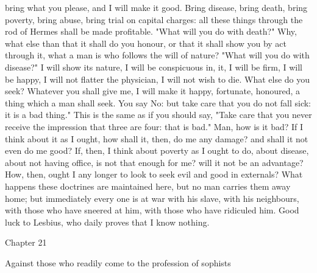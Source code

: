 \documentclass[a4paper]{article}
\begin{document}
bring what you please, and I will make it good. Bring disease, bring death,
bring poverty, bring abuse, bring trial on capital charges: all these things
through the rod of Hermes shall be made profitable. "What will you do with
death?" Why, what else than that it shall do you honour, or that it shall show
you by act through it, what a man is who follows the will of nature? "What will
you do with disease?" I will show its nature, I will be conspicuous in, it, I
will be firm, I will be happy, I will not flatter the physician, I will not
wish to die. What else do you seek? Whatever you shall give me, I will make it
happy, fortunate, honoured, a thing which a man shall seek.
    You say No: but take care that you do not fall sick: it is a bad thing."
This is the same as if you should say, "Take care that you never receive the
impression that three are four: that is bad." Man, how is it bad? If I think
about it as I ought, how shall it, then, do me any damage? and shall it not
even do me good? If, then, I think about poverty as I ought to do, about
disease, about not having office, is not that enough for me? will it not be an
advantage? How, then, ought I any longer to look to seek evil and good in
externals? What happens these doctrines are maintained here, but no man carries
them away home; but immediately every one is at war with his slave, with his
neighbours, with those who have sneered at him, with those who have ridiculed
him. Good luck to Lesbius, who daily proves that I know nothing.

Chapter 21

Against those who readily come to the profession of sophists
\end{document}
